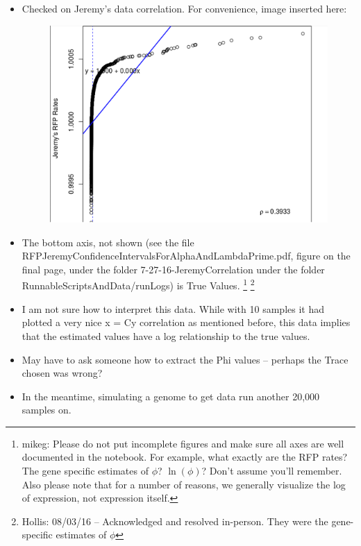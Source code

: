\documentclass[12pt,hyperref]{labbook}
\newcommand{\sep}{\discretionary{}{}{}} %
\begin{document}
\begin{itemize}
    \item Checked on Jeremy's data correlation. For convenience, image inserted here:
    \begin{figure}[ht!]
        \center
        \includegraphics[width=\textwidth,keepaspectratio]{figures/7-27-16-JeremyCorrelation.png}
        \label{Jeremy Correlation 7-27-16}
    \end{figure}
    \item The bottom axis, not shown (see the file RFPJeremyConfidenceIntervalsForAlphaAndLambdaPrime.pdf, figure on the final page, under the folder 7\sep -\sep 27\sep -\sep 16\sep -\sep Jeremy\sep Correlation under the folder RunnableScriptsAndData/runLogs) is True Values.
        \footnote{mikeg: Please do not put incomplete figures and make sure all axes are well documented in the notebook.
        For example, what exactly are the RFP rates? The gene specific estimates of $\phi$? $\ln(\phi)$?  Don't assume you'll remember.
        Also please note that for a number of reasons, we generally visualize the log of expression, not expression itself.
}
        \footnote{Hollis: 08/03/16 -- Acknowledged and resolved in-person.
        They were the gene-specific estimates of $\phi$}
    \item I am not sure how to interpret this data. 
    While with 10 samples it had plotted a very nice x = Cy correlation as mentioned before, this data implies that the estimated values have a log relationship to the true values.
    \item May have to ask someone how to extract the Phi values -- perhaps the Trace chosen was wrong?
    \item In the meantime, simulating a genome to get data run another 20,000 samples on.

\end{itemize}
\end{document}
